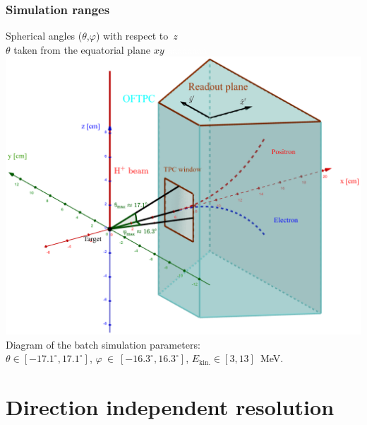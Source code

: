 \documentclass{beamer}
\begin{document}
	\begin{frame}
		\frametitle{Simulation ranges}
		\centering
		\large{Spherical angles ($\theta$,$\varphi$) with respect to~$z$}\\
		\small{$\theta$ taken from the equatorial plane $xy$}
		\centering
		\textcolor{white}{aaaaaaaa}\includegraphics[height= 0.61 \textheight]{../images/tpc_micro_simulation.png}\newline
		\small{Diagram of the batch simulation parameters:\\ $\theta\in[-17.1^\circ,17.1^\circ]$, $\varphi~\in~[-16.3^\circ,16.3^\circ]$, $ E_\text{kin.} \in [3,13] $~MeV.}
	\end{frame}
	
	\section{Direction independent resolution}
	
\end{document}
